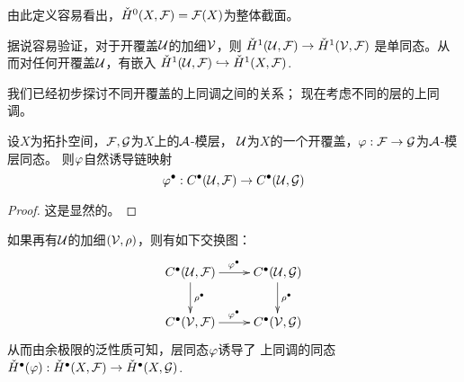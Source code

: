 由此定义容易看出，$\check{H}^0(X,\mathcal{F})=\mathcal{F}(X)$为整体截面。


{
  \color{gray}
  据说容易验证，对于开覆盖$\mathcal{U}$的加细$\mathcal{V}$，则
  $\check{H}^1(\mathcal{U},\mathcal{F})\to\check{H}^1(\mathcal{V},\mathcal{F})$
  是单同态。从而对任何开覆盖$\mathcal{U}$，有嵌入
  $\check{H}^1(\mathcal{U},\mathcal{F})\hookrightarrow\check{H}^1(X,\mathcal{F})$.
}

我们已经初步探讨不同开覆盖的\Cech 上同调之间的关系；
现在考虑不同的层的\Cech 上同调。

\begin{prop}
设$X$为拓扑空间，$\mathcal{F},\mathcal{G}$为$X$上的$\mathcal{A}$-模层，
$\mathcal{U}$为$X$的一个开覆盖，$\varphi:\mathcal{F}\to\mathcal{G}$为$\mathcal{A}$-模层同态。
则$\varphi$自然诱导链映射
$$
  \varphi^{\bullet}:C^{\bullet}(\mathcal{U},\mathcal{F})
  \to C^{\bullet}(\mathcal{U},\mathcal{G})
$$
\end{prop}

\begin{proof}
这是显然的。
\end{proof}

如果再有$\mathcal{U}$的加细$(\mathcal{V},\rho)$，则有如下交换图：
$$
  \xymatrix{
     C\updot(\mcalU,\mcalF)
       \ar[r]^{\fai\updot}
       \ar[d]^{\rho\updot}
    &C\updot(\mcalU,\mcalG)
       \ar[d]^{\rho\updot}
  \\
     C\updot(\mcalV,\mcalF)
       \ar[r]^{\fai\updot}
    &C\updot(\mcalV,\mcalG)
  }
$$
从而由余极限的泛性质可知，层同态$\varphi$诱导了\Cech
上同调的同态$\check{H}^{\bullet}(\varphi):\check{H}^{\bullet}(X,\mathcal{F})
\to\check{H}^{\bullet}(X,\mathcal{G})$.\vs


